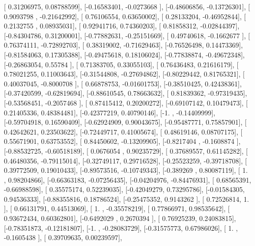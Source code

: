 \documentclass{article}
\begin{document}
       [ 0.31206975,  0.08788599],
       [-0.16583401, -0.0273668 ],
       [-0.48606856, -0.13726301],
       [ 0.9093798 , -0.21642992],
       [ 0.76106554,  0.63650002],
       [ 0.28133204, -0.46952844],
       [ 0.2132755 ,  0.08935031],
       [ 0.92941716,  0.74360203],
       [ 0.81858312, -0.02844397],
       [-0.84304786,  0.31200001],
       [-0.77882631, -0.25151669],
       [ 0.49740618, -0.1662677 ],
       [ 0.76374111, -0.72892703],
       [ 0.38319002, -0.71629463],
       [-0.76526498,  0.14473369],
       [-0.81584063,  0.17305388],
       [-0.49475618,  0.18106024],
       [-0.77838874, -0.49672348],
       [-0.26863054,  0.55784   ],
       [ 0.71383705,  0.33055103],
       [ 0.76436483,  0.21616179],
       [ 0.78021255,  0.11003643],
       [-0.31544808, -0.27694862],
       [-0.80229442,  0.81765321],
       [ 0.40037045, -0.8000708 ],
       [ 0.66878753, -0.01601753],
       [-0.38510425,  0.42438361],
       [-0.37420599, -0.62819694],
       [-0.88610545,  0.78663632],
       [ 0.81839362, -0.97319435],
       [-0.53568451, -0.2057468 ],
       [ 0.87415412,  0.20200272],
       [-0.69107142,  0.10479473],
       [ 0.21405336,  0.48384481],
       [-0.42377219,  0.40790146],
       [-1.        , -0.14409999],
       [-0.59704918,  0.16590409],
       [-0.62924909,  0.90043675],
       [-0.95487771,  0.75857901],
       [ 0.42642621,  0.23503622],
       [-0.72449717,  0.41005674],
       [ 0.48619146,  0.08707175],
       [ 0.55671901,  0.63753552],
       [ 0.84450602, -0.13209905],
       [-0.8217404 , -0.1608874 ],
       [-0.88532725, -0.60518189],
       [ 0.0676054 ,  0.90235729],
       [ 0.37689557,  0.61145282],
       [ 0.46480356, -0.79115014],
       [-0.32749117,  0.29716528],
       [-0.25523259, -0.39718708],
       [ 0.39772509,  0.19010433],
       [-0.89573516, -0.10749343],
       [-0.389269  ,  0.80087119],
       [ 1.        ,  0.98204866],
       [-0.66363183, -0.07256435],
       [-0.04204976, -0.84476931],
       [ 0.68565391, -0.66988598],
       [ 0.35575174,  0.52239035],
       [-0.42049279,  0.73295786],
       [-0.01584305,  0.94536333],
       [-0.88355816,  0.18786524],
       [-0.25475352,  0.9143262 ],
       [ 0.72526814,  1.        ],
       [ 0.66131791,  0.44513069],
       [ 1.        , -0.35578219],
       [ 0.77866971,  0.98535642],
       [ 0.93672434,  0.60362801],
       [-0.6492029 ,  0.2670394 ],
       [ 0.76925239,  0.24083815],
       [-0.78351873, -0.12181807],
       [-1.        , -0.28083729],
       [-0.31575773,  0.67986026],
       [ 1.        , -0.1605438 ],
       [ 0.39709635,  0.00239597],
\end{document}
